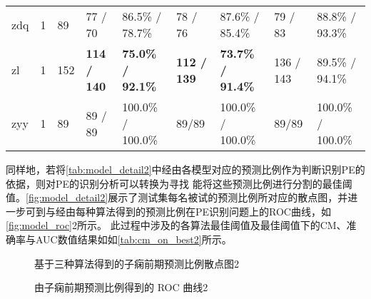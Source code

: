 \begin{center}
\begin{longtable}{m{1cm}<{\centering}m{1cm}<{\centering}m{1cm}<{\centering}m{1.5cm}<{\centering}m{2cm}<{\centering}m{1.5cm}<{\centering}m{2cm}<{\centering}m{1.5cm}<{\centering}m{2cm}<{\centering}}
             zdq       & 1           & 89                    & 77 / 70         & 86.5\% / 78.7\%     & 78 / 76         & 87.6\% / 85.4\%     & 79 / 83         & 88.8\% / 93.3\%                                       \\
             zl        & 1           & 152                   & \textbf{114 / 140}        & \textbf{75.0\% / 92.1\%}     & \textbf{112 / 139}         & \textbf{73.7\% / 91.4\%}     & 136 / 143        & 89.5\% / 94.1\%                                    \\
             zyy       & 1           & 89                    & 89 / 89         & 100.0\% / 100.0\%    & 89/89         & 100.0\% / 100.0\%    & 89/89         & 100.0\% / 100.0\%                                     \\    
      \end{longtable}
\end{center}
\vspace{-1.0cm} 

同样地，若将\autoref{tab:model_detail2}中经由各模型对应的预测比例作为判断识别PE的依据，则对PE的识别分析可以转换为寻找
能将这些预测比例进行分割的最佳阈值。\autoref{fig:model_detail2}展示了测试集每名被试的预测比例所对应的散点图，并进一步可到与经由每种算法得到的预测比例在PE识别问题上的ROC曲线，如\autoref{fig:model_roc}2所示。
此过程中涉及的各算法最佳阈值及最佳阈值下的CM、准确率与AUC数值结果如如\autoref{tab:cm_on_best2}所示。

\begin{figure}[htbp]
      \centering
      \quad
      \caption{\label{fig:model_detail2}基于三种算法得到的子痫前期预测比例散点图2}
\end{figure}

\begin{figure}[htbp]
      \centering
      \quad
      \caption{\label{fig:model_roc2}由子痫前期预测比例得到的 ROC 曲线2}
\end{figure}

